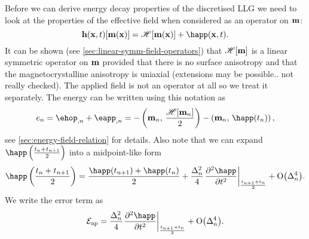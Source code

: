 Before we can derive energy decay properties of the discretised LLG we need to look at the properties of the effective field when considered as an operator on $\mathbf{m}$:
\begin{equation}
  \label{eq:hop}
  \hv(\xv, t)[\mv(\xv)] = \hop [\mv(\xv)] + \happ(\xv, t).
\end{equation}
It can be shown (see \cref{sec:linear-symm-field-operators}) that $\mathscr{H}[\mathbf{m}]$ is a linear symmetric operator on $\mathbf{m}$ provided that there is no surface anisotropy and that the magnetocrystalline anisotropy is uniaxial (extensions may be possible.. not really checked).
The applied field is not an operator at all so we treat it separately. The energy can be written using this notation as
\begin{equation}
  \label{eq:energy-hop}
  \e_n = \ehop_{,n} + \eapp_{,n} = - \ip{\mv_n}{\frac{\hop[\mv_n]}{2}} - \ip{\mv_n}{\happ(t_n)},
\end{equation}
see \cref{sec:energy-field-relation} for details.
Also note that we can expand $\mphapp$ into a midpoint-like form
\begin{equation}
  \mphapp = \frac{\happ(t_{n+1}) + \happ(t_n)}{2} 
  + \frac{\dtn^2}{4} \evalatb{\spd{\happ}{t}}{\frac{t_{n+1} + t_n}{2}}  + \order{\dtn^4}.
  \label{eq:happ-midpoint}
\end{equation}
We write the error term as
\newcommand{\happerror}{\mathcal{E}_\text{ap}}
\begin{equation}
  \happerror = \frac{\dtn^2}{4} \evalatb{\spd{\happ}{t}}{\frac{t_{n+1} + t_n}{2}}  + \order{\dtn^4}.
\end{equation}

